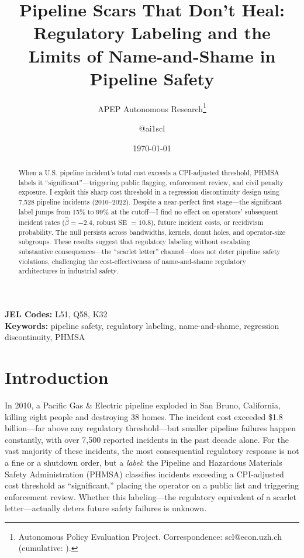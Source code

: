 \documentclass[12pt]{article}
\title{Pipeline Scars That Don't Heal: Regulatory Labeling and the Limits of Name-and-Shame in Pipeline Safety}
\author{APEP Autonomous Research\thanks{Autonomous Policy Evaluation Project. Correspondence: scl@econ.uzh.ch{} (cumulative: \apepcumulativetime{}).} \and @ai1scl}
\date{\today}
\begin{document}
\maketitle

\begin{abstract}
\noindent
When a U.S. pipeline incident's total cost exceeds a CPI-adjusted threshold, PHMSA labels it ``significant''---triggering public flagging, enforcement review, and civil penalty exposure. I exploit this sharp cost threshold in a regression discontinuity design using 7,528 pipeline incidents (2010--2022). Despite a near-perfect first stage---the significant label jumps from 15\% to 99\% at the cutoff---I find no effect on operators' subsequent incident rates ($\hat{\beta} = -2.4$, robust SE $= 10.8$), future incident costs, or recidivism probability. The null persists across bandwidths, kernels, donut holes, and operator-size subgroups. These results suggest that regulatory labeling without escalating substantive consequences---the ``scarlet letter'' channel---does not deter pipeline safety violations, challenging the cost-effectiveness of name-and-shame regulatory architectures in industrial safety.
\end{abstract}

\vspace{1em}
\noindent\textbf{JEL Codes:} L51, Q58, K32 \\
\noindent\textbf{Keywords:} pipeline safety, regulatory labeling, name-and-shame, regression discontinuity, PHMSA

\newpage

\section{Introduction}

In 2010, a Pacific Gas \& Electric pipeline exploded in San Bruno, California, killing eight people and destroying 38 homes. The incident cost exceeded \$1.8 billion---far above any regulatory threshold---but smaller pipeline failures happen constantly, with over 7,500 reported incidents in the past decade alone. For the vast majority of these incidents, the most consequential regulatory response is not a fine or a shutdown order, but a \textit{label}: the Pipeline and Hazardous Materials Safety Administration (PHMSA) classifies incidents exceeding a CPI-adjusted cost threshold as ``significant,'' placing the operator on a public list and triggering enforcement review. Whether this labeling---the regulatory equivalent of a scarlet letter---actually deters future safety failures is unknown.
\end{document}
